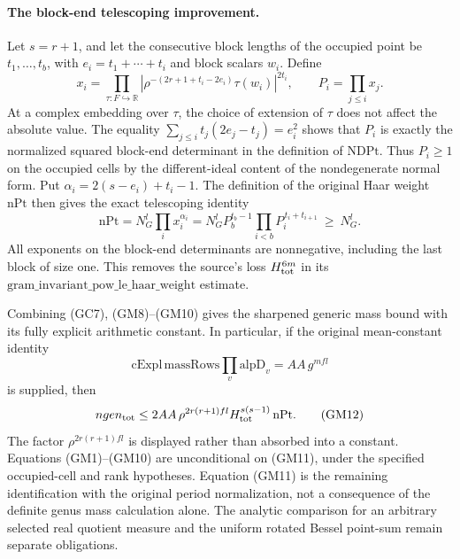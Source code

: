 \paragraph{The block-end telescoping improvement.}
Let \(s=r+1\), and let the consecutive block lengths
of the occupied point be \(t_1,\ldots,t_b\), with
\(e_i=t_1+\cdots+t_i\) and block scalars \(w_i\).
Define
\[
 x_i=\prod_{\tau:F\hookrightarrow\mathbb R}
      \left|\rho^{-(2r+1+t_i-2e_i)}\tau(w_i)\right|^{2t_i},
 \qquad P_i=\prod_{j\le i}x_j .
\]
At a complex embedding over \(\tau\), the choice of
extension of \(\tau\) does not affect the absolute value.
The equality
\(\sum_{j\le i}t_j(2e_j-t_j)=e_i^2\)
shows that \(P_i\) is exactly the normalized squared
block-end determinant in the definition of \(\mathrm{NDPt}\).
Thus \(P_i\ge1\) on the occupied cells by the
different-ideal content of the nondegenerate normal form.
Put \(\alpha_i=2(s-e_i)+t_i-1\).
The definition of the original Haar weight \(\mathrm{nPt}\)
then gives the exact telescoping identity
\[
 \mathrm{nPt}
  =N_G^l\prod_i x_i^{\alpha_i}
  =N_G^l P_b^{t_b-1}
          \prod_{i<b}P_i^{\,t_i+t_{i+1}}
  \ \ge\ N_G^l .
 \tag{GM10}
\]
All exponents on the block-end determinants are nonnegative,
including the last block of size one.  This removes the
source's loss \(H_{\rm tot}^{6m}\) in its
\(\mathrm{gram\_invariant\_pow\_le\_haar\_weight}\) estimate.

Combining (GC7), (GM8)--(GM10) gives the sharpened
generic mass bound with its fully explicit arithmetic
constant.  In particular, if the original mean-constant
identity
\[
 \mathrm{cExpl}\,\mathrm{massRows}\prod_v\mathrm{alpD}_v
                   =AA\,g^{mfl}
 \tag{GM11}
\]
is supplied, then
\[
 ngen_{\rm tot}
    \le 2 AA\,\rho^{2r(r+1)fl}
                H_{\rm tot}^{s(s-1)}\,\mathrm{nPt}.
 \tag{GM12}
\]
The factor \(\rho^{2r(r+1)fl}\) is displayed rather than
absorbed into a constant. Equations (GM1)--(GM10) are
unconditional on (GM11), under the specified occupied-cell
and rank hypotheses. Equation (GM11) is the remaining
identification with the original period normalization, not
a consequence of the definite genus mass calculation alone.
The analytic comparison for an arbitrary selected real
quotient measure and the uniform rotated Bessel point-sum
remain separate obligations.
